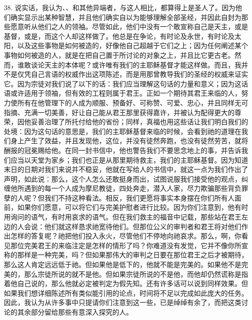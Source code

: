38. 说实话，我认为、、和其他异端者，与这人相比，都算得上是圣人了。因为他们确实显示出某种智慧，并且他们确实自以为能够理解全部圣经，并因此自封为那些愿意听从他们之人的领袖。尽管如此，他们中没有一个敢宣称自己是天主，或是基督，或是，而这个人却这样做了。他总是在争论，有时论及永世，有时论及太阳，以及这些事物是如何被造的，好像他自己超越于它们之上；因为任何阐述某个事物如何被造的人，就是在把自己置于所讨论的对象之上，并且比它更古老。然而，谁敢谈论天主的本体呢？或许唯有我们的主耶稣基督才能这样做。而且，我并不是仅凭自己言语的权威作出这项陈述，而是用那曾教导我们的圣经的权威来证实它。因为宗徒对我们说了以下的话：我们应当理解这句话的力量和意义；因为这话语或许适用于领袖，但有效的工程则属于君王。正如一个期待其君王来临的人，努力使所有在他管理下的人成为顺服、预备好、可称赞、可爱、忠心，并且同样无可指摘、充满一切美善，好让自己能从君王那里获得嘉许，并被认为配得更大的尊荣，因他妥善治理了所托付给他的省份；同样，真福也用这些话让我们明白我们的处境：因为这句话的意思是，我们的主耶稣基督来临的时候，会看到祂的道理在我们身上产生了效益，并且发现他，这位，并没有徒然奔跑，也没有徒然劳苦，就将酬报的冠冕赐给他。在同一封书信中，他也警告我们不要思念地上的事，并告诉我们应当以天堂为家乡；我们也正是从那里期待救主，我们的主耶稣基督。因为知道末日的日期对我们来说并不稳妥，他就在写给人的书信中，就这一点为我们作出了声明，如此说：那么，这个人怎么还敢挺身而出，试图说服我们接受他的观点，纠缠他所遇到的每一个人成为摩尼教徒，四处奔走，潜入人家，尽力欺骗那些背负罪孽的人呢？但我们不持这种看法。相反，我们更愿将事实本身摆在你们所有人面前，如果你们愿意，可以将它们与完美护慰者进行比较。因为你们注意到，他有时用询问的语气，有时用哀求的语气。但在我们救主的福音中记载，那些站在君王左边的人会说：他们就这样恳求祂宽待他们。但那位公义的审判者和君王将对他们作出怎样的答复呢？祂把他们投入永火，尽管他们不停地向祂哀求。那么，啊，你看见那位完美君王的来临注定是怎样的情形了吗？你难道没有发觉，它并不像你所宣称的那样是一种完美，吗？但如果那伟大的审判之日要在那位君王之后才被期待，那么这人肯定远远低于祂。但如果他是低下的，他就不能是完美的。如果他不是完美的，那么宗徒所说的就不是他。但如果宗徒所说的不是他，而他却仍然谎称是指着他自己说的，那么他就必定被判定为假先知。还有许多话可以说到同样效果。但如果我们想详细陈述所有类似能引用的论点，时间将不足以完成如此庞大的任务。因此，我认为从许多事中只提请你们注意到这一些，已是绰绰有余了，而把这类讨论的其余部分留给那些有意深入探究的人。\par

